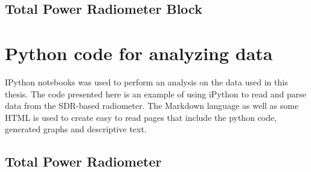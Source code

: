 \newcommand{\code}[2]{
  \hrulefill
  \subsection*{#1}
  
  \vspace{2em}
}

\code{Total Power Radiometer Block}{Code/TPR.py}
\newpage


%  


\section*{Python code for analyzing data}
IPython notebooks was used to perform an analysis on the data used in this thesis.  The code presented here is an example of using iPython to read and parse data from the SDR-based radiometer.  The Markdown language as well as some HTML is used to create easy to read pages that include the python code, generated graphs and descriptive text.  

\newcommand{\pythoncode}[2]{
  \hrulefill
  \subsection*{#1}
  
  \vspace{2em}
}

\pythoncode{Total Power Radiometer}{Code/iPython/Radiometer_Parse.py}
